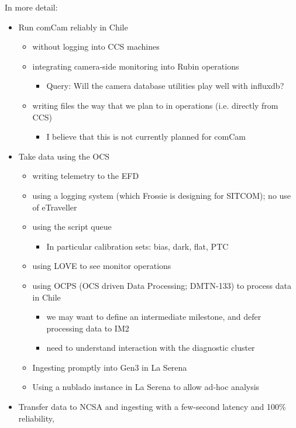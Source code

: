 In more detail:
\begin{itemize}
\item Run comCam reliably in Chile
  \begin{itemize}
  \item without logging into CCS machines
  \item integrating camera-side monitoring into Rubin operations
    \begin{itemize}
    \item Query: Will the camera database utilities play well with influxdb?
    \end{itemize}
  \item writing files the way that we plan to in operations (i.e. directly from CCS)
    \begin{itemize}
    \item \Nb I believe that this is not currently planned for comCam
    \end{itemize}
  \end{itemize}
\item Take data using the OCS
  \begin{itemize}
  \item writing telemetry to the EFD
  \item using a logging system (which Frossie is designing for SITCOM); no use of \eg eTraveller
  \item using the script queue
    \begin{itemize}
    \item In particular calibration sets: bias, dark, flat, PTC
    \end{itemize}
  \item using LOVE to see monitor operations
  \item using OCPS (OCS driven Data Processing; DMTN-133) to process data in Chile
    \begin{itemize}
    \item we may want to define an intermediate milestone, and defer processing data to IM2
    \item need to understand interaction with the diagnostic cluster
    \end{itemize}
  \item Ingesting promptly into Gen3 in La Serena
  \item Using a nublado instance in La Serena to allow ad-hoc analysis
  \end{itemize}
\item Transfer data to NCSA and ingesting with a few-second latency and 100\% reliability,

\end{itemize}
